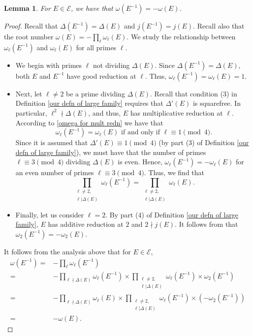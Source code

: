 \documentclass[12pt]{amsart}
\newtheorem{lemma}[theorem]{Lemma}
\newcommand{\cE}{\mathcal{E}}
\numberwithin{equation}{section}
\begin{document}
\begin{lemma}\label{lemma for root numbers}
    For $E\in \cE$, we have that $\omega(E^{-1})=-\omega(E)$.
\end{lemma}
\begin{proof}
Recall that $\Delta(E^{-1})=\Delta(E)$ and $j(E^{-1})=j(E)$. Recall also that the root number $\omega(E)=-\prod_\ell \omega_\ell(E)$. We study the relationship between $\omega_\ell(E^{-1})$ and $\omega_\ell(E)$ for all primes $\ell$. 
\begin{itemize}
    \item  We begin with primes $\ell$ not dividing $\Delta(E)$. Since $\Delta(E^{-1})=\Delta(E)$, both $E$ and $E^{-1}$ have good reduction at $\ell$. Thus, $\omega_\ell(E^{-1})=\omega_\ell(E)=1$.
    \item Next, let $\ell\neq 2$ be a prime dividing $\Delta(E)$. Recall that condition (3) in Definition \ref{our defn of large family} requires that $\Delta'(E)$ is squarefree. In particular, $\ell^2 \nmid \Delta(E)$, and thus, $E$ has multiplicative reduction at $\ell$. According to \eqref{omega for mult redn} we have that \[\omega_\ell(E^{-1})=\omega_\ell(E)\text{ if and only if }\ell \equiv 1 \pmod 4.\]
    Since it is assumed that $\Delta'(E)\equiv 1 \pmod 4$ (by part (3) of Definition \ref{our defn of large family}), we must have that the number of primes $\ell \equiv 3 \pmod 4$ dividing $\Delta(E)$ is even. Hence, $\omega_\ell(E^{-1})=-\omega_\ell(E)$ for an even number of primes $\ell \equiv 3 \pmod 4$. Thus, we find that 
    \[\prod_{\substack{\ell\neq 2,\\ \ell| \Delta(E)}}\omega_\ell(E^{-1})=\prod_{\substack{\ell\neq 2,\\ \ell| \Delta(E)}}\omega_\ell(E).\]
    \item Finally, let us consider $\ell=2$. By part (4) of Definition \ref{our defn of large family}, $E$ has additive reduction at $2$ and $2\nmid j(E)$. It follows from \cite[Lemma 12]{Wong} that $\omega_2(E^{-1})=-\omega_2(E)$.
\end{itemize} It follows from the analysis above that for $E\in \cE$,
\[\begin{split}\omega(E^{-1})= & -\prod_{\ell}\omega_\ell(E^{-1}) \\
=& -\prod_{\ell\nmid \Delta(E)}\omega_\ell(E^{-1})\times \prod_{\substack{\ell\neq 2,\\ \ell| \Delta(E)}}\omega_\ell(E^{-1})\times \omega_2(E^{-1})\\
=& -\prod_{\ell\nmid \Delta(E)}\omega_\ell(E)\times \prod_{\substack{\ell\neq 2,\\ \ell| \Delta(E)}}\omega_\ell(E^{-1})\times \left(-\omega_2(E^{-1})\right)\\
=& -\omega(E).
\end{split}
\]
\end{proof}
\end{document}
